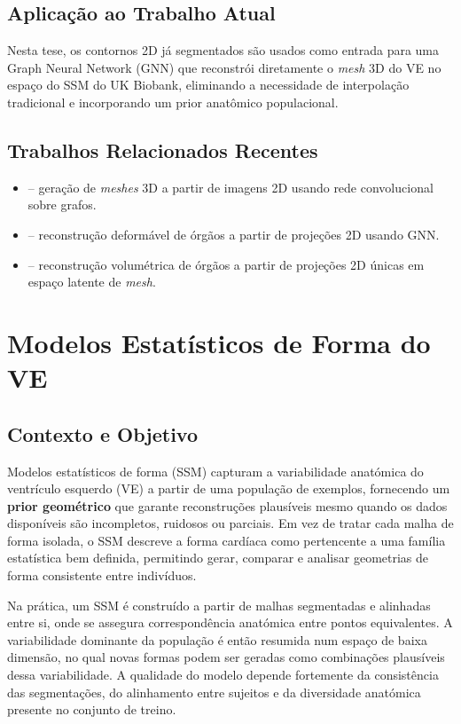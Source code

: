 \documentclass[12pt,a4paper]{report}
\begin{document}
\subsection*{Aplicação ao Trabalho Atual}
Nesta tese, os contornos 2D já segmentados são usados como entrada para uma Graph Neural Network (GNN) que reconstrói diretamente o \textit{mesh} 3D do VE no espaço do SSM do UK Biobank, eliminando a necessidade de interpolação tradicional e incorporando um prior anatômico populacional.

\subsection*{Trabalhos Relacionados Recentes}
\begin{itemize}
    \item \parencite{wang-2018} – geração de \textit{meshes} 3D a partir de imagens 2D usando rede convolucional sobre grafos.
    \item \parencite{nakao2021, nakao2022} – reconstrução deformável de órgãos a partir de projeções 2D usando GNN.
    \item \parencite{wijesinghe-2024} – reconstrução volumétrica de órgãos a partir de projeções 2D únicas em espaço latente de \textit{mesh}.
\end{itemize}

\section{Modelos Estatísticos de Forma do VE}

\subsection*{Contexto e Objetivo}
Modelos estatísticos de forma (SSM) capturam a variabilidade anatómica do ventrículo esquerdo (VE) a partir de uma população de exemplos, fornecendo um \textbf{prior geométrico} que garante reconstruções plausíveis mesmo quando os dados disponíveis são incompletos, ruidosos ou parciais. Em vez de tratar cada malha de forma isolada, o SSM descreve a forma cardíaca como pertencente a uma família estatística bem definida, permitindo gerar, comparar e analisar geometrias de forma consistente entre indivíduos. \parencite{bai-2015,demarvao2014,pilgram-2005}

Na prática, um SSM é construído a partir de malhas segmentadas e alinhadas entre si, onde se assegura correspondência anatómica entre pontos equivalentes. A variabilidade dominante da população é então resumida num espaço de baixa dimensão, no qual novas formas podem ser geradas como combinações plausíveis dessa variabilidade. A qualidade do modelo depende fortemente da consistência das segmentações, do alinhamento entre sujeitos e da diversidade anatómica presente no conjunto de treino. \parencite{roohi-2012,pilgram-2005}
\end{document}

